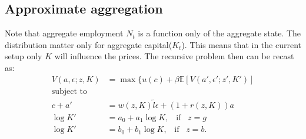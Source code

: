 \documentclass[12pt]{article}
\begin{document}
\subsection{Approximate aggregation}
Note that aggregate employment $N_t$ is a function only of the aggregate state. The distribution matter only for aggregate capital($K_t$). This means that in the current setup only $K$ will influence the prices. The recursive problem then can be recast as:
\begin{align*}
V(a, \epsilon; z, K) & = \max \{ u(c) + \beta \mathbb{E}[V(a', \epsilon'; z', K')] \\
\text{subject to} \\
c + a' & = w(z, K)\tilde{l}\epsilon + (1 + r(z, K))a \\
\log K' & = a_0 + a_1 \log K, \; \; \; \text{if} \; \; \; z = g\\
\log K' & = b_0 + b_1 \log K, \; \; \; \text{if} \; \; \; z = b.
\end{align*} 
\end{document}
